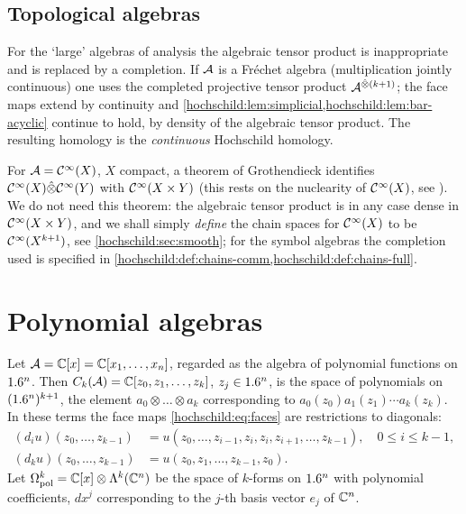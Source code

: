 \subsection{Topological algebras}\label{hochschild:sec:topological}
For the `large' algebras of analysis the algebraic tensor product is
inappropriate and is replaced by a completion. If $\mathcal{A}$ is a Fréchet algebra
(multiplication jointly continuous) one uses the completed projective tensor
product $\mathcal{A}^{\hat\otimes(k+1)}$; the face maps extend by continuity and
\cref{hochschild:lem:simplicial,hochschild:lem:bar-acyclic} continue to hold,
by density of the algebraic tensor product. The resulting homology is the
\emph{continuous} Hochschild homology.

For $\mathcal{A}=\mathcal{C}^\infty(X)$, $X$ compact, a theorem of Grothendieck identifies
$\mathcal{C}^\infty(X)\hat\otimes\mathcal{C}^\infty(Y)$ with $\mathcal{C}^\infty(X\times Y)$ (this rests on the nuclearity
of $\mathcal{C}^\infty(X)$, see \cite[Chapter~51]{Treves}). We do not need this theorem:
the algebraic tensor product is in any case dense in $\mathcal{C}^\infty(X\times Y)$, and we
shall simply \emph{define} the chain spaces for $\mathcal{C}^\infty(X)$
to be $\mathcal{C}^\infty(X^{k+1})$, see \cref{hochschild:sec:smooth}; for the symbol
algebras the completion used is specified in \cref{hochschild:def:chains-comm,hochschild:def:chains-full}.

\section{Polynomial algebras}\label{hochschild:sec:polynomial}

Let $\mathcal{A}=\mathbb{C}[x]=\mathbb{C}[x_1,\dots,x_n]$, regarded as the algebra of polynomial
functions on $1.6^n$. Then $C_k(\mathcal{A})=\mathbb{C}[z_0,z_1,\dots,z_k]$, $z_j\in1.6^n$, is
the space of polynomials on $(1.6^n)^{k+1}$, the element
$a_0\otimes\dots\otimes a_k$ corresponding to $a_0(z_0)a_1(z_1)\cdots
a_k(z_k)$. In these terms the face maps \eqref{hochschild:eq:faces} are
restrictions to diagonals:
\begin{equation}
\begin{aligned}
  (d_iu)(z_0,\dots,z_{k-1})&=u(z_0,\dots,z_{i-1},z_i,z_i,z_{i+1},\dots,z_{k-1}),
  \quad 0\le i\le k-1,\\
  (d_ku)(z_0,\dots,z_{k-1})&=u(z_0,z_1,\dots,z_{k-1},z_0).
\end{aligned}
\label{hochschild:eq:faces-fn}
\end{equation}
Let $\Omega^k_{\mathrm{pol}}=\mathbb{C}[x]\otimes\Lambda^k(\mathbb{C}^n)$ be the space of
$k$-forms on $1.6^n$ with polynomial coefficients, $dx^j$ corresponding to the
$j$-th basis vector $e_j$ of $\mathbb{C}^n$.

